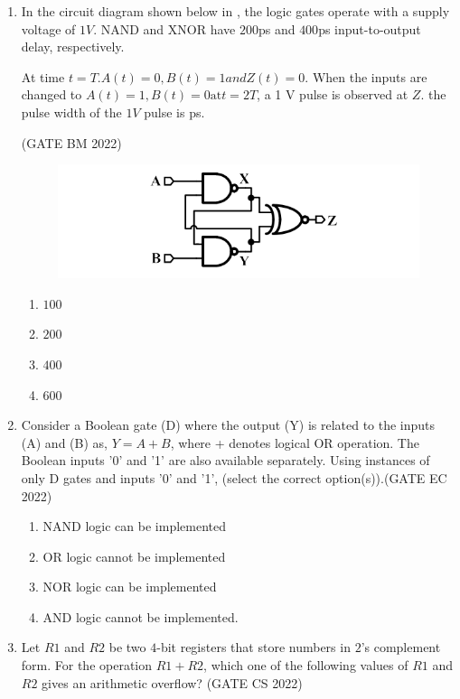 \begin{enumerate}[label=\arabic*.,ref=\theenumi]
\item In the circuit diagram shown below
in , the logic gates operate with a supply voltage of $1 V$. NAND and XNOR have $200$ps and $400$ps input-to-output delay, respectively.

At time $t=T.A(t)=0,B(t)=1 and Z(t)=0.$ When the inputs are changed to $A(t)=1,B(t)=0 \text{at} t=2T$, a 1 V pulse is observed at $Z$. the pulse width of the $1 V$ pulse is  ps.


\hfill{(GATE BM 2022)}

\begin{figure}[H]
\centering
\includegraphics[width=0.75\columnwidth]{figs/bm2022.png}
\caption{}
\label{fig:GATE Digram}
\end{figure}

\begin{enumerate}
\item $100$
\item $200$
\item $400$
\item $600$
\end {enumerate}

\item 
Consider a Boolean gate (D) where the output (Y) is related to the inputs (A) and (B) as, $Y = A + B$, where + denotes logical OR operation. The Boolean inputs '0' and '1' are also available separately. Using instances of only D gates and inputs '0' and '1', (select the correct option(s)).\hfill{(GATE EC 2022)}

\begin{enumerate}
\item  NAND logic can be implemented
\item  OR logic cannot be implemented
\item  NOR logic can be implemented
\item  AND logic cannot be implemented.
\end{enumerate}

\item Let $R1$ and $R2$ be two $4$-bit registers that store numbers in $2$’s complement form.
For the operation $R1+R2$, which one of the following values of $R1$ and $R2$ gives an
arithmetic overflow?
\hfill{(GATE CS 2022)}


\end{enumerate}
